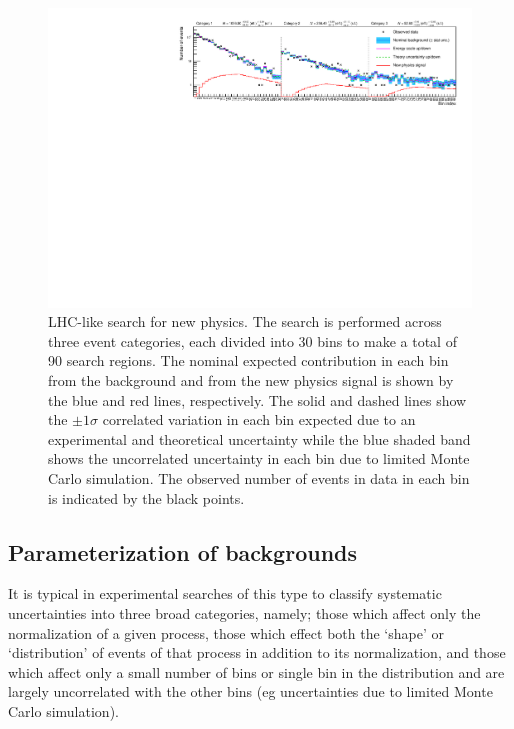 \documentclass[11pt]{article}
\begin{document}
\begin{figure}
\begin{center}
\includegraphics[width=\textwidth]{figures/t}
\end{center}
\caption{LHC-like search for new physics. The search is performed across three event categories, each divided into 30 bins to make a total of 90 search regions. The nominal expected contribution in each bin from the
background and from the new physics signal is shown by the blue and red lines, respectively. The solid and dashed lines show the $\pm1\sigma$ correlated variation in each bin expected due to an experimental and theoretical
uncertainty while the blue shaded band shows the uncorrelated uncertainty in each bin due to limited Monte Carlo simulation. The observed number of events in data in each bin is indicated by the black points.}
\label{fig:toy}
\end{figure}

\clearpage

\subsection{Parameterization of backgrounds}

It is typical in experimental searches of this type to classify systematic uncertainties into three broad categories, namely; those which affect only the normalization of a given process, those which effect both the
`shape' or `distribution' of events of that process in addition to its normalization, and those which affect only a small number of bins or single bin in the distribution and are largely uncorrelated with the other
bins (eg uncertainties due to limited Monte Carlo simulation).
\end{document}

